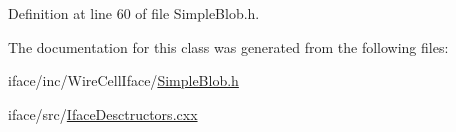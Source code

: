 Definition at line 60 of file Simple\+Blob.\+h.



The documentation for this class was generated from the following files\+:\begin{DoxyCompactItemize}
\item 
iface/inc/\+Wire\+Cell\+Iface/\hyperlink{_simple_blob_8h}{Simple\+Blob.\+h}\item 
iface/src/\hyperlink{_iface_desctructors_8cxx}{Iface\+Desctructors.\+cxx}\end{DoxyCompactItemize}
